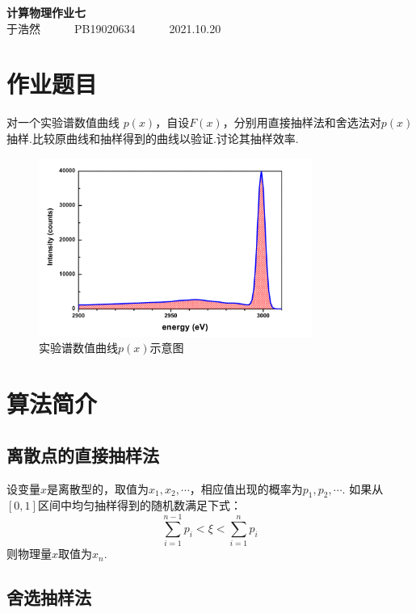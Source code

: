 \documentclass[12pt,a4paper,utf8]{ctexart}
\begin{document}
\begin{center}
    {\LARGE\textbf{计算物理作业七}}\\
    \textrm{于浩然}~~~~~~\textrm{PB19020634}~~~~~~\textrm{2021.10.20}
\end{center}

\section{作业题目}

对一个实验谱数值曲线
$p(x)$，自设$F(x)$，分别用直接抽样法和舍选法对$p(x)$抽样.比较原曲线和抽样得到的曲线以验证.讨论其抽样效率.

\begin{figure}[htp]
    \centering
    \includegraphics[width=0.8\textwidth]{tit.png}
    \caption{实验谱数值曲线$p(x)$示意图}
    \end{figure}

\section{算法简介}

\subsection{离散点的直接抽样法}

设变量$x$是离散型的，取值为$x_1,
x_2,\cdots$，相应值出现的概率为$p_1,p_2,\cdots$.
如果从$[0,1]$区间中均匀抽样得到的随机数满足下式：
\begin{equation}
    \sum_{i=1}^{n-1} p_i < \xi < \sum_{i=1}^{n} p_i
\end{equation}
则物理量$x$取值为$x_n$.

\subsection{舍选抽样法}
\end{document}
